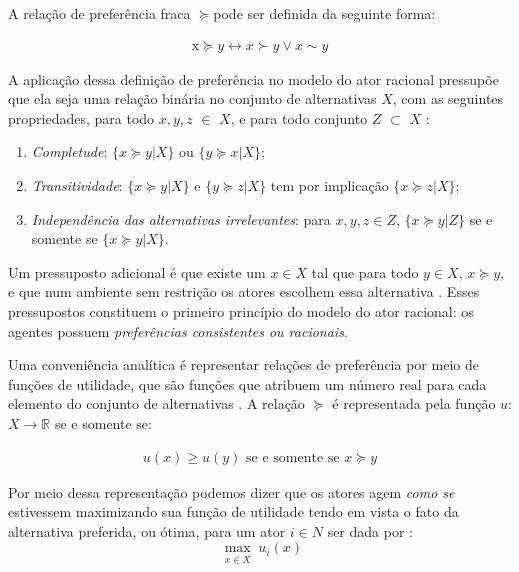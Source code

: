 A relação de preferência fraca \( \succeq \)pode ser definida da seguinte forma:

\begin{align*}
  \text{x} \succeq y \leftrightarrow x \succ y \lor x \sim y
\end{align*}

A aplicação dessa definição de preferência no modelo do ator racional pressupõe
que ela seja uma relação binária no conjunto de alternativas \(X\), com as
seguintes propriedades, para todo \(x,y,z\) $\in$ \(X\), e para todo conjunto
\(Z\) $\subset$ \(X\) \cite{gintis2016individuality,
  binmore2008rational}:



\begin{enumerate}
\item \textit{Completude}: \(\{ x \succeq y | X \}\) ou \(\{ y \succeq x | X \}\);
\item \textit{Transitividade}: \( \{x \succeq y | X\} \) e \(\{y \succeq z | X \}\) tem por
  implicação \(\{x \succeq z | X\}\);
 \item \textit{Independência das alternativas irrelevantes}: para \(x,y,z \in Z\),
   \(\{x \succeq y | Z \}\) se e somente se \(\{x \succeq y | X\}\).
\end{enumerate}

Um pressuposto adicional é que existe um \(x \in X\) tal que para todo \(y \in X\),
\(x \succeq y\), e que num ambiente sem restrição os atores escolhem essa alternativa
\cite{gintis2009bounds}. Esses pressupostos constituem o primeiro princípio do
modelo do ator racional: os agentes possuem \textit{preferências consistentes ou
racionais}.

Uma conveniência analítica é representar relações de preferência por meio de
funções de utilidade, que são funções que atribuem um número real para cada
elemento do conjunto de alternativas \cite{sep-preferences}. A relação \( \succeq\) é
representada pela função \(u\): \(X \longrightarrow \mathbb{R}\) se e somente se:

\begin{align*}
  u(x) \geq u(y)
  \text{ se e somente se }
  x \succeq y
\end{align*}

Por meio dessa representação podemos dizer que os atores agem \textit{como se}
estivessem maximizando sua função de utilidade tendo em vista o fato da alternativa
preferida, ou ótima, para um ator $i \in N$ ser dada por \cite{binmore2008rational}:
\[\max_{\substack{x \in  X}}
  u_i(x)
\]

